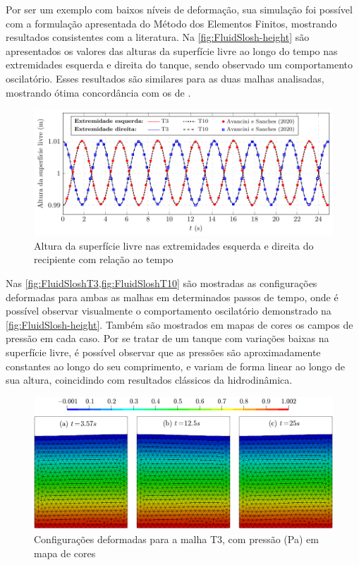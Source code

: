 \documentclass[Tese.tex]{subfiles}
\begin{document}
Por ser um exemplo com baixos níveis de deformação, sua simulação foi possível com a formulação apresentada do Método dos Elementos Finitos, mostrando resultados consistentes com a literatura. Na \autoref{fig:FluidSlosh-height} são apresentados os valores das alturas da superfície livre ao longo do tempo nas extremidades esquerda e direita do tanque, sendo observado um comportamento oscilatório. Esses resultados são similares para as duas malhas analisadas, mostrando ótima concordância com os de .

\begin{figure}[!htb]
	\centering
	\caption{Altura da superfície livre nas extremidades esquerda e direita do recipiente com relação ao tempo}
	\label{fig:FluidSlosh-height}
	\includegraphics[scale=1.0]{Figuras/FluidSlosh/FluidSlosh-height.pdf}
\end{figure}

Nas \cref{fig:FluidSloshT3,fig:FluidSloshT10} são mostradas as configurações deformadas para ambas as malhas em determinados passos de tempo, onde é possível observar visualmente o comportamento oscilatório demonstrado na \autoref{fig:FluidSlosh-height}. Também são mostrados em mapas de cores os campos de pressão em cada caso. Por se tratar de um tanque com variações baixas na superfície livre, é possível observar que as pressões são aproximadamente constantes ao longo do seu comprimento, e variam de forma linear ao longo de sua altura, coincidindo com resultados clássicos da hidrodinâmica.

\begin{figure}[!htb]
	\centering
	\caption{Configurações deformadas para a malha T3, com pressão (Pa) em mapa de cores}
	\label{fig:FluidSloshT3}
	\includegraphics[scale=0.47]{Figuras/FluidSlosh/FluidSloshT3.png}
\end{figure}
\end{document}
